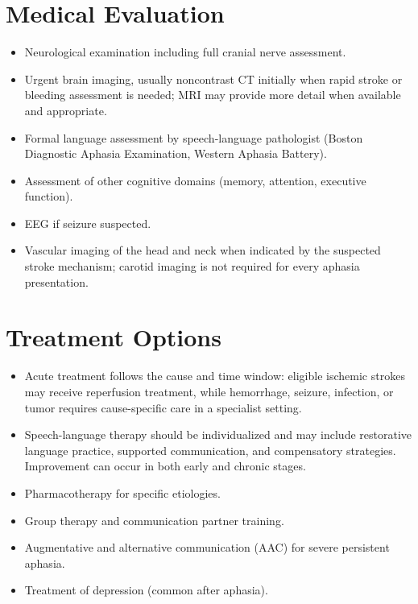 \section*{Medical Evaluation}
\begin{itemize}
 \item Neurological examination including full cranial nerve assessment.
 \item Urgent brain imaging, usually noncontrast CT initially when rapid stroke or bleeding assessment is needed; MRI may provide more detail when available and appropriate.
 \item Formal language assessment by speech-language pathologist (Boston Diagnostic Aphasia Examination, Western Aphasia Battery).
 \item Assessment of other cognitive domains (memory, attention, executive function).
 \item EEG if seizure suspected.
 \item Vascular imaging of the head and neck when indicated by the suspected stroke mechanism; carotid imaging is not required for every aphasia presentation.
\end{itemize}

\section*{Treatment Options}
\begin{itemize}
 \item Acute treatment follows the cause and time window: eligible ischemic strokes may receive reperfusion treatment, while hemorrhage, seizure, infection, or tumor requires cause-specific care in a specialist setting.
 \item Speech-language therapy should be individualized and may include restorative language practice, supported communication, and compensatory strategies. Improvement can occur in both early and chronic stages.
 \item Pharmacotherapy for specific etiologies.
 \item Group therapy and communication partner training.
 \item Augmentative and alternative communication (AAC) for severe persistent aphasia.
 \item Treatment of depression (common after aphasia).
\end{itemize}

